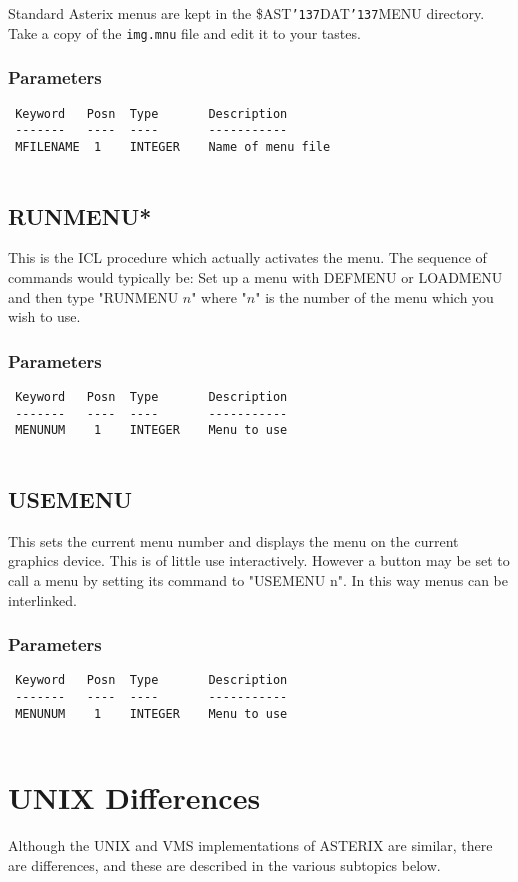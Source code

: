 \documentclass{book}
\renewcommand{\_}{{\tt\char'137}}     %
\begin{document}
Standard Asterix menus are kept in the \$AST\_DAT\_MENU directory.
Take a copy of the {\tt img.mnu} file and edit it to your tastes.
 
\subsection{Parameters}
\begin{verbatim}
 Keyword   Posn  Type       Description
 -------   ----  ----       -----------
 MFILENAME  1    INTEGER    Name of menu file
 
\end{verbatim}\section{RUNMENU*}
This is the ICL procedure which actually activates the menu. The
sequence of commands would typically be:
Set up a menu with DEFMENU or LOADMENU and then type "RUNMENU $n$"
where "$n$" is the number of the menu which you wish to use.
 
\subsection{Parameters}
\begin{verbatim}
 Keyword   Posn  Type       Description
 -------   ----  ----       -----------
 MENUNUM    1    INTEGER    Menu to use
 
\end{verbatim}\section{USEMENU}
This sets the current menu number and displays the menu on the current
graphics device. This is of little use interactively. However a button
may be set to call a menu by setting its command to "USEMENU n". In this
way menus can be interlinked.
 
\subsection{Parameters}
\begin{verbatim}
 Keyword   Posn  Type       Description
 -------   ----  ----       -----------
 MENUNUM    1    INTEGER    Menu to use
 
\end{verbatim}\chapter{UNIX Differences}
Although the UNIX and VMS implementations of ASTERIX are similar,
there are differences, and these are described in the various
subtopics below.
 
\end{document}
